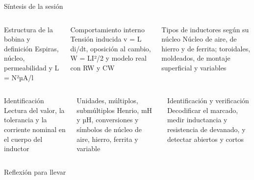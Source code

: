 \documentclass[aspectratio=169,11pt,xcolor={table}]{beamer}
\begin{document}
\begin{frame}{Síntesis de la sesión}
\begin{columns}[T,onlytextwidth]
\begin{cardB}{Estructura de la bobina y definición}
\scriptsize Espiras, núcleo, permeabilidad y L = N²µA/l
\end{cardB}
\begin{cardO}{Comportamiento interno}
\scriptsize Tensión inducida v = L di/dt, oposición al cambio, W = LI²/2 y modelo real con RW y CW
\end{cardO}
\begin{cardG}{Tipos de inductores según su núcleo}
\scriptsize Núcleo de aire, de hierro y de ferrita; toroidales, moldeados, de montaje superficial y variables
\end{cardG}
\end{columns}
\vspace{2mm}
\begin{columns}[T,onlytextwidth]
\begin{cardB}{Identificación}
\scriptsize Lectura del valor, la tolerancia y la corriente nominal en el cuerpo del inductor
\end{cardB}
\begin{cardO}{Unidades, múltiplos, submúltiplos}
\scriptsize Henrio, mH y µH, conversiones y símbolos de núcleo de aire, hierro, ferrita y variable
\end{cardO}
\begin{cardG}{Identificación y verificación}
\scriptsize Decodificar el marcado, medir inductancia y resistencia de devanado, y detectar abiertos y cortos
\end{cardG}
\end{columns}
\end{frame}

\begin{frame}{Reflexión para llevar}
\centering
{}
\end{frame}
\end{document}
